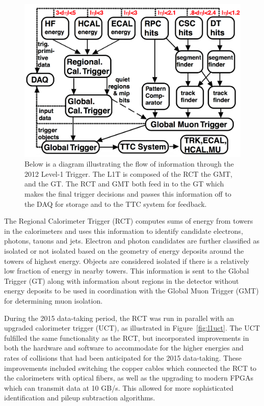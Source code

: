 \begin{figure}[htb]
\caption[The 2012 Level-1 Trigger]{
Below is a diagram illustrating the flow
 of information through the 2012 Level-1 Trigger.
The L1T is composed of the RCT
 the GMT, and the GT.
The RCT and GMT both feed in to the GT
 which makes the final trigger decisions
 and passes this information off to the
 DAQ for storage and to the TTC system
 for feedback.
 }
\label{fig:l1trig}
\includegraphics[width=\textwidth]{pdfs/experiment/l1trigger.pdf}
\end{figure}

The Regional Calorimeter Trigger (RCT) computes
 sums of energy from towers in the calorimeters
 and uses this information to identify candidate
 electrons, photons, tauons and jets.
Electron and photon candidates are further classified as
 isolated or not isolated based on the geometry
 of energy deposits around the towers of highest energy.
Objects are considered isolated if there is
 a relatively low fraction of energy in nearby
 towers.
This information is sent to the Global Trigger (GT)
 along with information about
 regions in the detector without energy deposits 
 to be used in coordination with the Global Muon Trigger (GMT)
 for determining muon isolation.

During the 2015
 data-taking period, the RCT was run in parallel
 with an upgraded calorimeter trigger (UCT),
 as illustrated in Figure~\ref{fig:l1uct}.
The UCT fulfilled the same functionality
 as the RCT, but incorporated improvements
 in both the hardware and software to accommodate
 for the higher energies and rates of collisions 
 that had been anticipated for the 2015 data-taking.
These improvements included switching
 the copper cables which connected the RCT to the 
 calorimeters with optical fibers,
 as well as the upgrading to modern
 FPGAs which can transmit data at 10 GB/s.
This allowed for more sophisticated 
 identification and pileup subtraction algorithms.

